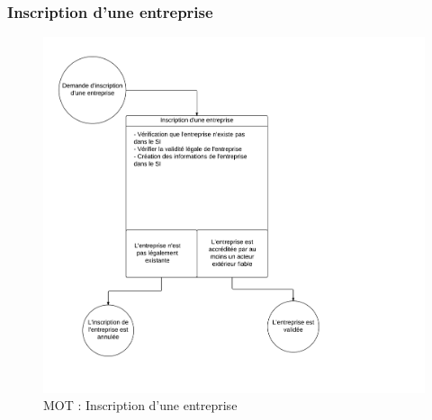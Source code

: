 % 
% 

\subsubsection{Inscription d'une entreprise}
\begin{figure}[ht!]
    \centering
    \includegraphics[width=\textwidth]{mot-inscription-entreprise}
    \caption{MOT : Inscription d'une entreprise}
    \label{fig:mot-inscription-entreprise}
\end{figure}
\newpage

